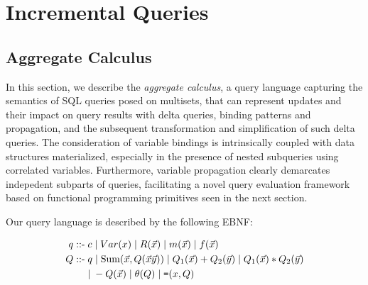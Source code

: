 \section{Incremental Queries}

\subsection{Aggregate Calculus}

\def\calcsum{\mbox{Sum}}
\def\calceq{\mbox{{\tt =}}}
\def\calcgt{\mbox{{\tt >}}}
\def\calcgte{\mbox{{\tt >=}}}
\def\calclte{\mbox{{\tt <=}}}

\def \q{q}
\def \qq{Q}
\def \qqa{Q_1}
\def \qqb{Q_2}
\def \v#1{\mbox{#1}}
\def \vv#1{\mbox{{\tiny #1}}}

In this section, we describe the \textit{aggregate calculus}, a query language
capturing the semantics of SQL queries posed on multisets, that can represent
updates and their impact on query results with delta queries, binding patterns
and propagation, and the subsequent transformation and simplification of such
delta queries. The consideration of variable bindings is intrinsically coupled
with data structures materialized, especially in the presence of nested
subqueries using correlated variables. Furthermore, variable propagation
clearly demarcates indepedent subparts of queries, facilitating a novel query
evaluation framework based on functional programming primitives seen in the
next section.

\noindent Our query language is described by the following EBNF:

\begin{align*} 
\q \; \mbox{::-} &
  \;    c \;|\; Var(x)
  \;|\; R(\vec{x}) \;|\; m(\vec{x}) \;|\; f(\vec{x})
\\
\comment{
& \;|\; \theta(x,y)   \;|\; \theta_c(x)
  \;|\; \calceq(\q,y) \;|\; \calceq(x,y)
\\
}
\qq \; \mbox{::-} & \; \q \;|\; \calcsum(\vec{x}, \qq(\vec{x}\vec{y}))
    \;|\; \qqa(\vec{x}) + \qqb(\vec{y}) \;|\; \qqa(\vec{x}) * \qqb({\vec{y}}) \\
&   \;|\; -\qq(\vec{x}) \;|\; \theta(\qq) \;|\; \calceq(x,\qq)
\end{align*}

